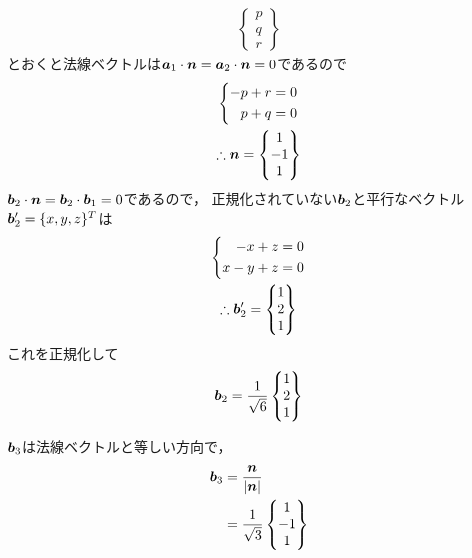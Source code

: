\begin{ans*}
\begin{other*}
\begin{gather}
\begin{Bmatrix}
        p \\ q \\ r
      \end{Bmatrix}
    \end{gather}
    とおくと法線ベクトルは${\bm{a}}_1\cdot{\bm{n}}={\bm{a}}_2\cdot{\bm{n}}=0$であるので
    \begin{gather}
      \left\{
      \begin{aligned}
        -p + r &= 0 \\
        p + q &= 0
      \end{aligned}
      \right.
      \\
      \therefore {\bm{n}} =
      \begin{Bmatrix}
        1 \\ -1 \\ 1
      \end{Bmatrix}
    \end{gather}
    ${\bm{b}}_2\cdot{\bm{n}}={\bm{b}}_2\cdot{\bm{b}}_1=0$であるので，
    正規化されていない${\bm{b}}_2$と平行なベクトル${\bm{b}}'_2 = \{x, y, z\}^T$は
    \begin{gather}
      \left\{
      \begin{aligned}
        -x + z &= 0 \\
        x - y + z &= 0
      \end{aligned}
      \right.
      \\
      \therefore {\bm{b}}'_2 =
      \begin{Bmatrix}
        1 \\ 2 \\ 1
      \end{Bmatrix}
    \end{gather}
    これを正規化して
    \begin{gather}
      {\bm{b}}_2 = 
      \frac{1}{\sqrt{6}}
      \begin{Bmatrix}
        1 \\ 2 \\ 1
      \end{Bmatrix}
    \end{gather}

    ${\bm{b}}_3$は法線ベクトルと等しい方向で，
    \begin{align}
      {\bm{b}}_3 
      &= \frac{{\bm{n}}}{|{\bm{n}}|} \\
      &= \frac{1}{\sqrt{3}}
      \begin{Bmatrix}
        1 \\ -1 \\ 1
      \end{Bmatrix}
    \end{align}
  \end{other*}
\end{ans*}

